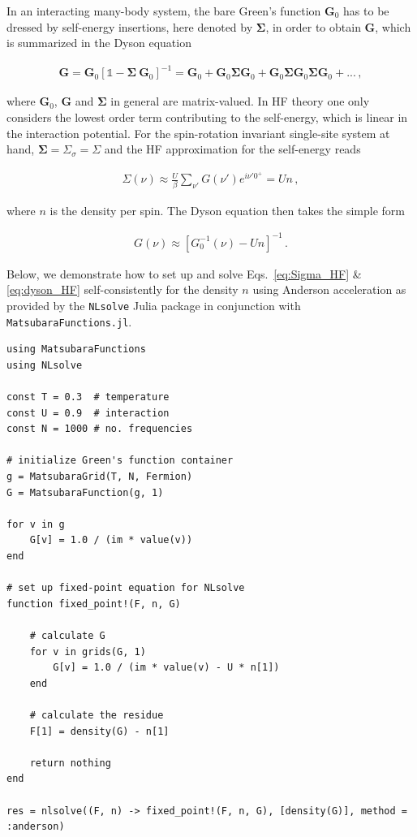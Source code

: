 \documentclass{SciPost}
\newcommand{\Gmat}{\boldsymbol{G}}
\newcommand{\Sigmamat}{\boldsymbol{\Sigma}}
\begin{document}
In an interacting many-body system, the bare Green's function $\Gmat_0$ has to be dressed by self-energy insertions, here denoted by $\Sigmamat$, in order to obtain $\Gmat$, which is summarized in the Dyson equation 
%
\begin{linenomath}
    \begin{align}
        \Gmat = \Gmat_0 [\mathbb{1} - \Sigmamat \ \Gmat_0]^{-1} = \Gmat_0 + \Gmat_0 \Sigmamat \Gmat_0 + \Gmat_0 \Sigmamat \Gmat_0 \Sigmamat \Gmat_0 + ... \,,
    \end{align}
\end{linenomath}
%
where $\Gmat_0$, $\Gmat$ and $\Sigmamat$ in general are matrix-valued. In HF theory one only considers the lowest order term contributing to the self-energy, which is linear in the interaction potential. For the spin-rotation invariant single-site system at hand, $\Sigmamat = \Sigma_{\sigma} = \Sigma$ and the HF approximation for the self-energy reads
%
\begin{linenomath}
    \begin{align}
        \Sigma(\nu) \approx \tfrac{U}{\beta} \sum_{\nu'} G(\nu') e^{i\nu'0^{+}} = U n \,,
        \label{eq:Sigma_HF}
    \end{align}
\end{linenomath}
%
where $n$ is the density per spin. The Dyson equation then takes the simple form
%
\begin{linenomath}
    \begin{align}
        G(\nu) \approx [G^{-1}_0(\nu) - U n]^{-1} \,.
        \label{eq:dyson_HF}
    \end{align}
\end{linenomath}
%
Below, we demonstrate how to set up and solve Eqs.~\eqref{eq:Sigma_HF} \& \eqref{eq:dyson_HF} self-consistently for the density $n$ using Anderson acceleration \cite{anderson_iterative_1965, walker_anderson_2011} as provided by the \texttt{NLsolve} Julia package\cite{nlsolve} in conjunction with \texttt{MatsubaraFunctions.jl}.
%
\begin{verbatim}
using MatsubaraFunctions
using NLsolve

const T = 0.3  # temperature
const U = 0.9  # interaction
const N = 1000 # no. frequencies

# initialize Green's function container
g = MatsubaraGrid(T, N, Fermion)
G = MatsubaraFunction(g, 1)

for v in g 
    G[v] = 1.0 / (im * value(v))
end

# set up fixed-point equation for NLsolve 
function fixed_point!(F, n, G)

    # calculate G
    for v in grids(G, 1)
        G[v] = 1.0 / (im * value(v) - U * n[1])
    end

    # calculate the residue
    F[1] = density(G) - n[1]
    
    return nothing
end

res = nlsolve((F, n) -> fixed_point!(F, n, G), [density(G)], method = :anderson)
\end{verbatim}
\end{document}
